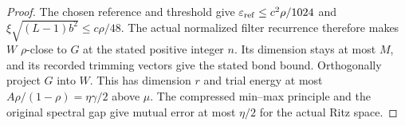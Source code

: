 \begin{proof}\leanok
    The chosen reference and threshold give
    $\varepsilon_{\rm ref}\le c^2\rho/1024$ and
    $\xi\sqrt{(L-1)b^2}\le c\rho/48$. The actual normalized filter
    recurrence therefore makes $W$ $\rho$-close to $G$ at the stated
    positive integer $n$. Its dimension stays at most $M$, and its
    recorded trimming vectors give the stated bond bound.
    Orthogonally project $G$ into $W$. This has dimension $r$ and trial
    energy at most $A\rho/(1-\rho)=\eta\gamma/2$ above $\mu$.
    The compressed min--max principle and the original spectral gap give
    mutual error at most $\eta/2$ for the actual Ritz space.
\end{proof}

